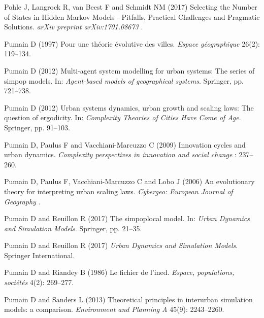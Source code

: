 \documentclass{article}
\begin{document}
\begin{thebibliography}{51}
{Pohle} J, {Langrock} R, {van Beest} F and {Schmidt} NM (2017) {Selecting the
  Number of States in Hidden Markov Models - Pitfalls, Practical Challenges and
  Pragmatic Solutions}.
\newblock \emph{arXiv preprint arXiv:1701.08673} .

Pumain D (1997) Pour une th{\'e}orie {\'e}volutive des villes.
\newblock \emph{Espace g{\'e}ographique} 26(2): 119--134.

Pumain D (2012{}) Multi-agent system modelling for urban systems:
  The series of simpop models.
\newblock In: \emph{Agent-based models of geographical systems}. Springer, pp.
  721--738.

Pumain D (2012{}) Urban systems dynamics, urban growth and scaling
  laws: The question of ergodicity.
\newblock In: \emph{Complexity Theories of Cities Have Come of Age}. Springer,
  pp. 91--103.

Pumain D, Paulus F and Vacchiani-Marcuzzo C (2009) Innovation cycles and urban
  dynamics.
\newblock \emph{Complexity perspectives in innovation and social change} :
  237--260.

Pumain D, Paulus F, Vacchiani-Marcuzzo C and Lobo J (2006) An evolutionary
  theory for interpreting urban scaling laws.
\newblock \emph{Cybergeo: European Journal of Geography} .

Pumain D and Reuillon R (2017{}) The simpoplocal model.
\newblock In: \emph{Urban Dynamics and Simulation Models}. Springer, pp.
  21--35.

Pumain D and Reuillon R (2017{}) \emph{Urban Dynamics and
  Simulation Models}.
\newblock Springer International.

Pumain D and Riandey B (1986) Le fichier de l'ined.
\newblock \emph{Espace, populations, soci{\'e}t{\'e}s} 4(2): 269--277.

Pumain D and Sanders L (2013) Theoretical principles in interurban simulation
  models: a comparison.
\newblock \emph{Environment and Planning A} 45(9): 2243--2260.


\end{thebibliography}
\end{document}
